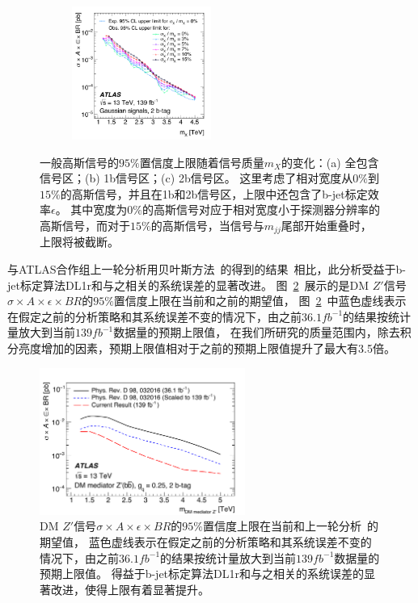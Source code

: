 \begin{figure}[!thbp]
\newline 
  \begin{subfigure}{.99\textwidth}
  \centering
  \includegraphics[width=0.5\textwidth]{figs/fig_08c.pdf}
  \caption{}
  \end{subfigure}
  \caption{
  一般高斯信号的$95\%$置信度上限随着信号质量$m_{X}$的变化：(a) 全包含信号区；(b) 1b信号区；(c) 2b信号区。
  这里考虑了相对宽度从$0\%$到$15\%$的高斯信号，并且在1b和2b信号区，上限中还包含了b-jet标定效率$\epsilon$。
  其中宽度为$0\%$的高斯信号对应于相对宽度小于探测器分辨率的高斯信号，而对于$15\%$的高斯信号，当信号与$m_{jj}$尾部开始重叠时，上限将被截断。
}
\label{fig:gauss}
\end{figure}


与ATLAS合作组上一轮分析用贝叶斯方法~\cite{Caldwell:2008fw}的得到的结果~\cite{EXOT-2016-33}相比，此分析受益于b-jet标定算法DL1r和与之相关的系统误差的显著改进。
图~\ref{fig:money_analysis}~展示的是DM $Z'$信号$\sigma\times A \times \epsilon \times BR$的$95\%$置信度上限在当前和之前的期望值，
图~\ref{fig:money_analysis}~中蓝色虚线表示在假定之前的分析策略和其系统误差不变的情况下，由之前$36.1fb^{-1}$的结果按统计量放大到当前$139fb^{-1}$数据量的预期上限值，
在我们所研究的质量范围内，除去积分亮度增加的因素，预期上限值相对于之前的预期上限值提升了最大有3.5倍。

\begin{figure}[htbp]
\centering
\includegraphics[width=0.6\textwidth]{figs/fig_09.pdf}
\caption{
DM $Z'$信号$\sigma\times A \times \epsilon \times BR$的$95\%$置信度上限在当前和上一轮分析~\cite{EXOT-2016-33}的期望值，
蓝色虚线表示在假定之前的分析策略和其系统误差不变的情况下，由之前$36.1fb^{-1}$的结果按统计量放大到当前$139fb^{-1}$数据量的预期上限值。
得益于b-jet标定算法DL1r和与之相关的系统误差的显著改进，使得上限有着显著提升。
}
\label{fig:money_analysis}
\end{figure}



